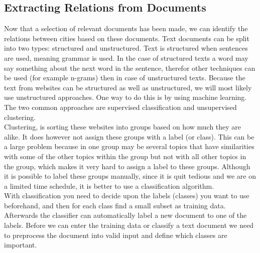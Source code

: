 \subsection{Extracting Relations from Documents}
Now that a selection of relevant documents has been made, we can identify the relations between cities based on these documents. Text documents can be split into two types: structured and unstructured. Text is structured when sentences are used, meaning grammar is used. In the case of structured texts a word may say something about the next word in the sentence, therefor other techniques can be used (for example n-grams) then in case of unstructured texts. Because the text from websites can be structured as well as unstructured, we will most likely use unstructured approaches. One way to do this is by using machine learning. The two common approaches are supervised classification and unsupervised clustering. \\

Clustering, is sorting these websites into groups based on how much they are alike. It does however not assign these groups with a label (or class). This can be a large problem because in one group may be several topics that have similarities with some of the other topics within the group but not with all other topics in the group, which makes it very hard to assign a label to these groups. Although it is possible to label these groups manually, since it is quit tedious and we are on a limited time schedule, it is better to use a classification algorithm. \\

With classification you need to decide upon the labels (classes) you want to use beforehand, and then for each class find a small subset as training data. Afterwards the classifier can automatically label a new document to one of the labels. Before we can enter the training data or classify a text document we need to preprocess the document into valid input and define which classes are important.

